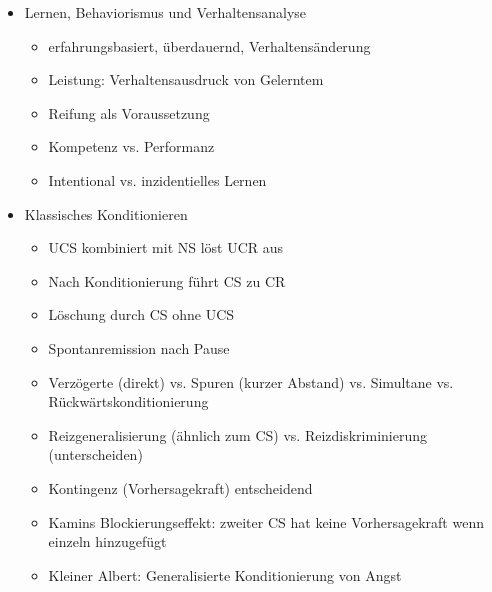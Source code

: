 \documentclass[11pt, paper=a4, twocolumn]{scrartcl}
\begin{document}
	\begin{itemize}
		\item Lernen, Behaviorismus und Verhaltensanalyse
			\begin{itemize}
				\item erfahrungsbasiert, überdauernd, Verhaltensänderung
				\item Leistung: Verhaltensausdruck von Gelerntem
				\item Reifung als Voraussetzung
				\item Kompetenz vs. Performanz
				\item Intentional vs. inzidentielles Lernen
			\end{itemize}

		\item Klassisches Konditionieren
			\begin{itemize}
				\item UCS kombiniert mit NS löst UCR aus
				\item Nach Konditionierung führt CS zu CR
				\item Löschung durch CS ohne UCS
				\item Spontanremission nach Pause
				\item Verzögerte (direkt) vs. Spuren (kurzer Abstand) vs. 
					Simultane vs. Rückwärtskonditionierung
				\item Reizgeneralisierung (ähnlich zum CS) vs. 
					Reizdiskriminierung (unterscheiden)
				\item Kontingenz (Vorhersagekraft) entscheidend
				\item Kamins Blockierungseffekt: zweiter CS hat keine 
					Vorhersagekraft wenn einzeln hinzugefügt
				\item Kleiner Albert: Generalisierte Konditionierung von 
					Angst
			\end{itemize}


\end{itemize}
\end{document}
